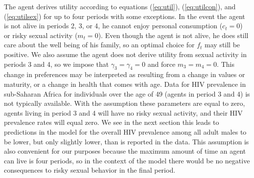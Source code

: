 \documentclass[12pt]{article}
\begin{document}
The agent derives utility according to equations (\ref{eq:util}), (\ref{eq:utilcon}), and (\ref{eq:utilsex}) for up to four periods with some exceptions.  In the event the agent is not alive in periods 2, 3, or 4, he cannot enjoy personal consumption ($c_t=0$) or risky sexual activity ($m_t=0$).  Even though the agent is not alive, he does still care about the well being of his family, so an optimal choice for $f_t$ may still be positive.  We also assume the agent does not derive utility from sexual activity in periods 3 and 4, so we impose that $\gamma_3=\gamma_4=0$ and force $m_3=m_4=0$.   This change in preferences may be interpreted as resulting from a change in values or maturity, or a change in health that comes with age.  Data for HIV prevalence in sub-Saharan Africa for individuals over the age of 49 (agents in period 3 and 4) is not typically available.  With the assumption these parameters are equal to zero, agents living in period 3 and 4 will have no risky sexual activity, and their HIV prevalence rates will equal zero.  We see in the next section this leads to predictions in the model for the overall HIV prevalence among all adult males to be lower, but only slightly lower, than is reported in the data.  This assumption is also convenient for our purposes because the maximum amount of time an agent can live is four periods, so in the context of the model there would be no negative consequences to risky sexual behavior in the final period.
\end{document}
